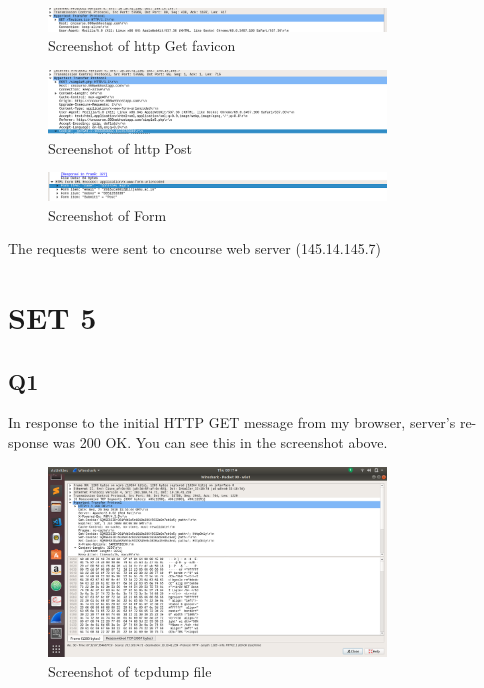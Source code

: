 \documentclass{article}
\begin{document}
  \begin{figure}[H]
 \centering
 \includegraphics[width=0.8\textwidth]{../Set4/b.png}
 \caption{\label{fig:PING}Screenshot of http Get favicon}
 \end{figure}
 
  \begin{figure}[H]
 \centering
 \includegraphics[width=0.8\textwidth]{../Set4/c.png}
 \caption{\label{fig:PING}Screenshot of http Post}
 \end{figure}
 
   \begin{figure}[H]
 \centering
 \includegraphics[width=0.8\textwidth]{../Set4/d.png}
 \caption{\label{fig:PING}Screenshot of Form}
 \end{figure}

The requests were sent to cncourse web server (145.14.145.7)\\
\section{SET 5}

\subsection{Q1}
In response to the initial HTTP GET message from my browser, server’s re-
sponse was 200 OK. You can see this in the screenshot above.\\

 \begin{figure}[H]
 \centering
 \includegraphics[width=0.8\textwidth]{../Set5/q1/a.png}
 \caption{\label{fig:PING}Screenshot of tcpdump file}
 \end{figure}
 
\end{document}
